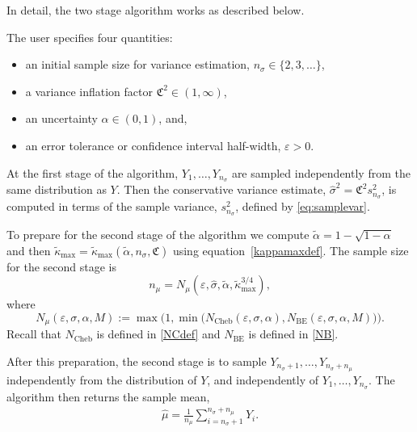 \documentclass[graybox]{svmult}
\newcommand{\fudge}{\mathfrak{C}}
\newcommand{\hmu}{\hat{\mu}}
\newcommand{\hsigma}{\hat{\sigma}}
\begin{document}
In detail, the two stage algorithm works
as described below.


\begin{algo} \label{twostagealgo} The user specifies
four quantities:
\begin{itemize}
\item 
an initial sample size for variance estimation, $n_\sigma \in \{2,3, \ldots\}$,
\item
a variance inflation factor $\fudge^2\in(1,\infty)$,
\item
an uncertainty $\alpha\in(0,1)$, and,
\item
an error tolerance or confidence interval half-width, $\varepsilon>0$.
\end{itemize}

At the first stage of the algorithm,
$Y_1,\dots,Y_{n_\sigma}$ are sampled independently
from the same distribution as $Y$.
Then the conservative variance estimate, $\hat\sigma^2 = \fudge^2 s^2_{n_\sigma}$,
is computed in terms of the sample variance, $s^2_{n_\sigma}$, defined by \eqref{eq:samplevar}.

To prepare for the second stage of the algorithm
we compute $\tilde\alpha = 1-\sqrt{1-\alpha}$
and then $\tilde\kappa_{\max} = \tilde\kappa_{\max}(\tilde\alpha,n_\sigma,\fudge)$
using equation~\eqref{kappamaxdef}.
The sample size for the second stage is
\begin{equation} \label{nmudef}
n_\mu = N_{\mu}(\varepsilon,\hsigma,\tilde\alpha,\tilde\kappa_{\max}^{3/4}),
\end{equation}
where
\begin{equation} \label{NCBdef}
N_{\mu}(\varepsilon,\sigma,\alpha,M) 
:= \max\bigl(1,\min\bigl(N_{\text{Cheb}}(\varepsilon,\sigma,\alpha), 
N_{\text{BE}}(\varepsilon,\sigma,\alpha,M) \bigr) \bigr).
\end{equation} 
Recall that
$N_{\text{Cheb}}$ is defined in \eqref{NCdef} and  $N_{\text{BE}}$ 
is defined in \eqref{NB}.  

After this preparation, the second stage is to sample
$Y_{n_\sigma+1},\dots,Y_{n_\sigma+n_\mu}$ independently
from the distribution of $Y$, and independently of $Y_{1},\dots,Y_{n_\sigma}$.  The algorithm then returns the sample mean,
\begin{align}\label{eq:theestimate}
\hmu = \frac1{n_\mu}\sum_{i=n_\sigma+1}^{n_\sigma+n_\mu}Y_i.
\end{align}
\end{algo}

\bigskip
\end{document}
